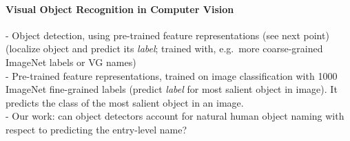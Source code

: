 



\paragraph{Visual Object Recognition in Computer Vision}
- Object detection, using pre-trained feature representations (see next point) (localize object and predict its \textit{label}; trained with, e.g.\ more coarse-grained ImageNet labels or VG names)\\
- Pre-trained feature representations, trained on image classification with 1000 ImageNet fine-grained labels (predict \textit{label} for most salient object in image). It predicts the class of the most salient object in an image. \\
- Our work: can object detectors account for natural human object naming with respect to predicting the entry-level name? 